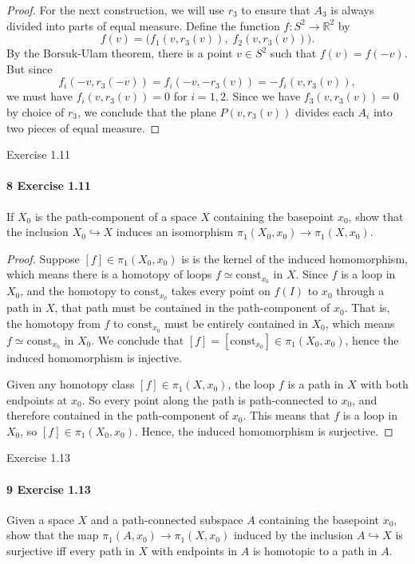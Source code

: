 \documentclass[12pt]{article}
\newlength{\myparskip}
\newenvironment{fullbox}{\begin{lrbox}{\savefullbox}\begin{minipage}{\dimexpr\textwidth-2\fboxsep\relax}\setlength{\parskip}{\myparskip}}{\end{minipage}\end{lrbox}\framebox[\textwidth]{\usebox{\savefullbox}}}
\newenvironment{pbox}[1][]{\begin{fullbox}\ifx#1\empty\else\paragraph{#1}\phantom{}\fi}{\end{fullbox}}
\theoremstyle{definition}
\newcommand{\R}{\mathbb{R}}
\newcommand{\<}{\langle}
\renewcommand{\>}{\rangle}
\newcommand{\inc}{\hookrightarrow}
\newcommand{\htpy}{\simeq}
\newcommand{\const}{\mathrm{const}}
\begin{document}
\begin{proof}
    For the next construction, we will use $r_3$ to ensure that $A_3$ is always divided into parts of equal measure.
    Define the function $f : S^2 \to \R^2$ by
    \[
        f(v) = \big(f_1(v, r_3(v)),\; f_2(v, r_3(v))\big).
    \]
    By the Borsuk-Ulam theorem, there is a point $v \in S^2$ such that $f(v) = f(-v)$.
    But since
    \[
        f_i(-v, r_3(-v)) = f_i(-v, -r_3(v)) = -f_i(v, r_3(v)),
    \]
    we must have $f_i(v, r_3(v)) = 0$ for $i = 1, 2$.
    Since we have $f_3(v, r_3(v)) = 0$ by choice of $r_3$, we conclude that the plane $P(v, r_3(v))$ divides each $A_i$ into two pieces of equal measure.
\end{proof}

\begin{pbox}[8 Exercise 1.11]
    If $X_0$ is the path-component of a space $X$ containing the basepoint $x_0$, show that the inclusion $X_0 \inc X$ induces an isomorphism $\pi_1(X_0, x_0) \to \pi_1(X, x_0)$.
\end{pbox}

\begin{proof}
    Suppose $[f] \in \pi_1(X_0, x_0)$ is is the kernel of the induced homomorphism, which means there is a homotopy of loops $f \htpy \const_{x_0}$ in $X$.
    Since $f$ is a loop in $X_0$, and the homotopy to $\const_{x_0}$ takes every point on $f(I)$ to $x_0$ through a path in $X$, that path must be contained in the path-component of $x_0$.
    That is, the homotopy from $f$ to $\const_{x_0}$ must be entirely contained in $X_0$, which means $f \htpy \const_{x_0}$ in $X_0$.
    We conclude that $[f] = [\const_{x_0}] \in \pi_1(X_0, x_0)$, hence the induced homomorphism is injective.

    Given any homotopy class $[f] \in \pi_1(X, x_0)$, the loop $f$ is a path in $X$ with both endpoints at $x_0$.
    So every point along the path is path-connected to $x_0$, and therefore contained in the path-component of $x_0$.
    This means that $f$ is a loop in $X_0$, so $[f] \in \pi_1(X_0, x_0)$.
    Hence, the induced homomorphism is surjective.
\end{proof}

\begin{pbox}[9 Exercise 1.13]
    Given a space $X$ and a path-connected subspace $A$ containing the basepoint $x_0$, show that the map $\pi_1(A, x_0) \to \pi_1(X, x_0)$ induced by the inclusion $A \inc X$ is surjective iff every path in $X$ with endpoints in $A$ is homotopic to a path in $A$.
\end{pbox}
\end{document}
